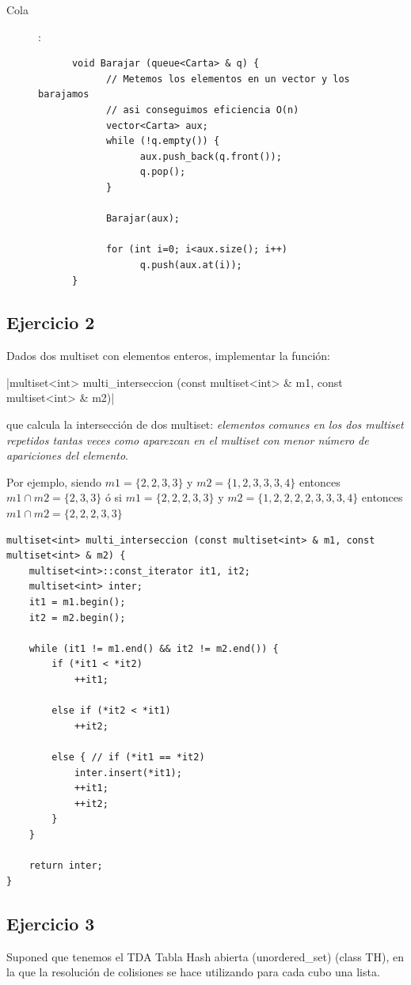 \documentclass[10pt,a4paper,spanish]{report}
\begin{document}
\begin{description}
      \item[Cola]:
      \begin{verbatim}
      void Barajar (queue<Carta> & q) {
            // Metemos los elementos en un vector y los barajamos
            // asi conseguimos eficiencia O(n)
            vector<Carta> aux;
            while (!q.empty()) {
                  aux.push_back(q.front());
                  q.pop();
            }

            Barajar(aux);

            for (int i=0; i<aux.size(); i++)
                  q.push(aux.at(i));
      }
      \end{verbatim}
\end{description}

\subsection{\textcolor[rgb]{0.5,0.8,1}Ejercicio 2}
\noindent
Dados dos multiset con elementos enteros, implementar la función:

|multiset<int> multi_interseccion (const multiset<int> & m1, const multiset<int> & m2)|

\noindent
que calcula la intersección de dos multiset: \textit{elementos comunes en los dos multiset repetidos tantas veces como aparezcan en el multiset con menor número de apariciones del elemento}.

\noindent
Por ejemplo, siendo $m1 = \{2,2,3,3\}$ y $m2 = \{1,2,3,3,3,4\}$ entonces $m1 \cap m2 = \{2,3,3\}$ ó si $m1 = \{2,2,2,3,3\}$ y $m2 = \{1,2,2,2,2,3,3,3,4\}$ entonces $m1 \cap m2 = \{2,2,2,3,3\}$

\begin{verbatim}
multiset<int> multi_interseccion (const multiset<int> & m1, const multiset<int> & m2) {
    multiset<int>::const_iterator it1, it2;
    multiset<int> inter;
    it1 = m1.begin();
    it2 = m2.begin();

    while (it1 != m1.end() && it2 != m2.end()) {
        if (*it1 < *it2)
            ++it1;

        else if (*it2 < *it1)
            ++it2;

        else { // if (*it1 == *it2)
            inter.insert(*it1);
            ++it1;
            ++it2;
        }
    }

    return inter; 
}
\end{verbatim}

\subsection{\textcolor[rgb]{0.5,0.8,1}Ejercicio 3}
\noindent
Suponed que tenemos el TDA Tabla Hash abierta (unordered\_set) (class TH), en la que la resolución de colisiones se hace utilizando para cada cubo una lista.
\end{document}

